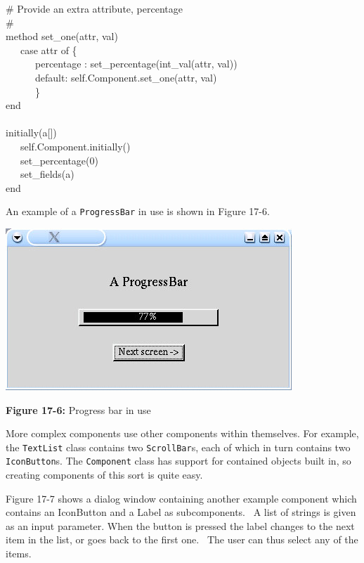 {\>   \# Provide an extra attribute,
{\textquotedbl}percentage{\textquotedbl} \\
\>   \# \\
\>   method set\_one(attr, val) \\
\>   \ \ \ case attr of \{ \\
\>   \ \ \ \ \ \ {\textquotedbl}percentage{\textquotedbl} :
set\_percentage(int\_val(attr, val)) \\
\>   \ \ \ \ \ \ default: self.Component.set\_one(attr, val) \\
\>   \ \ \ \ \ \ \} \\
\>   end \\
\ \\
\>   initially(a[]) \\
\>   \ \ \ self.Component.initially() \\
\>   \ \ \ set\_percentage(0) \\
\>   \ \ \ set\_fields(a) \\
end \\
}

An example of a \texttt{ProgressBar} in use is shown in Figure 17-6.

\begin{center}
\includegraphics[width=4.2398in,height=2.3953in]{ub-img/ub-img55.jpg}
\end{center}

{\sffamily\bfseries Figure 17-6:}
{\sffamily Progress bar in use}

More complex components use other components within themselves. For
example, the \texttt{TextList} class contains two \texttt{ScrollBar}s,
each of which in turn contains two \texttt{IconButton}s. The
\texttt{Component} class has support for contained objects built in, so
creating components of this sort is quite easy.

Figure 17-7 shows a dialog window containing another example component
which contains an IconButton and a Label as subcomponents. \ A list of
strings is given as an input parameter. When the button is pressed the
label changes to the next item in the list, or goes back to the first
one. \ The user can thus select any of the items.

